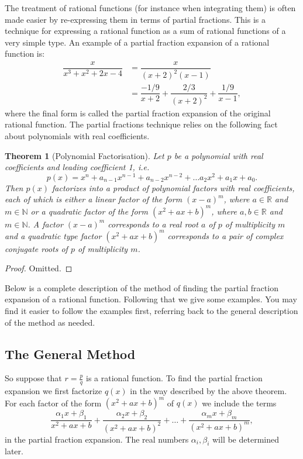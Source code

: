 \documentclass[extrafontsizes, twoside, a4paper]{memoir}
\theoremstyle{plain}%
\newtheorem{thm}{Theorem}[chapter]
\theoremstyle{definition}
\theoremstyle{remark}
\begin{document}
The treatment of rational functions (for instance when integrating
them) is often made
easier by re-expressing them in terms of partial fractions. This is
a technique for expressing a rational function as a sum of rational
functions of a very simple type. An example of a partial fraction
expansion of a rational function is:
\begin{align*}
\dfrac{x}{x^3 + x^2 +2x -4} &= \dfrac{x}{(x+2)^2 (x-1)} \\
&= \dfrac{-1/9}{x+2} + \dfrac{2/3}{(x+2)^2} + \dfrac{1/9}{x-1},
\end{align*}
where the final form is called the partial fraction expansion of the
original rational function. The partial fractions technique relies
on the following fact about polynomials with real coefficients.

\begin{thm}[Polynomial Factorisation]
\textit{Let $p$ be a polynomial with real coefficients and leading
coefficient 1, i.e.
$$p(x) = x^n + a_{n-1} x^{n-1} + a_{n-2} x^{n-2} + \dots a_2 x^2 +
a_1 x + a_0.$$ Then $p(x)$  factorizes into a product of polynomial
factors with real coefficients, each of which is either a linear
factor of the form $(x-a)^m$, where $a \in \mathbb{R}$ and $m \in
\mathbb{N}$ or a quadratic factor of the form $(x^2 + ax + b)^m$,
where $a,b \in \mathbb{R}$ and $m \in \mathbb{N}$. A factor
$(x-a)^m$ corresponds to a real root $a$ of $p$ of multiplicity $m$
and a quadratic type factor $(x^2 + ax + b)^m$ corresponds to a pair
of complex conjugate roots of $p$ of multiplicity $m$.}
\end{thm}
\begin{proof}
Omitted.
\end{proof}

Below is a complete description of the method of finding the partial
fraction expansion of a rational function. Following that we give
some examples. You may find it easier to follow the examples first,
referring back to the general description of the method as needed.

\subsection{The General Method}
So suppose that
$r=\tfrac{p}{q}$ is a rational function. To find the partial
fraction expansion we first factorize $q(x)$ in the way described by
the above theorem. For each factor of the form $(x^2 + ax + b)^m$ of
$q(x)$ we include the terms
$$\dfrac{\alpha_1 x + \beta_1}{x^2 + ax + b} + \dfrac{\alpha_2 x + \beta_2}{(x^2 + ax +
b)^2} + \dots + \dfrac{\alpha_m x + \beta_m}{(x^2 + ax + b)^m},$$
in
the partial fraction expansion. The real numbers $\alpha_i, \beta_i$
will be determined later.
\end{document}
